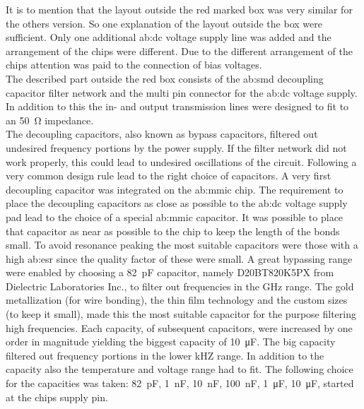 It is to mention that the layout outside the red marked box was very similar for the others version.
So one explanation of the layout outside the box were sufficient.
Only one additional \gls{ab:dc} voltage supply line was added and the arrangement of the chips were different.
Due to the different arrangement of the chips attention was paid to the connection of bias voltages.\\
The described part outside the red box consists of the \gls{ab:smd} decoupling capacitor filter network and the multi pin connector for the \gls{ab:dc} voltage supply.
In addition to this the in- and output transmission lines were designed to fit to an \SI{50}{\ohm} impedance. \\
The decoupling capacitors, also known as bypass capacitors, filtered out undesired frequency portions by the power supply.
If the filter network did not work properly, this could lead to undesired oscillations of the circuit.
Following a very common design rule lead to the right choice of capacitors.
A very first decoupling capacitor was integrated on the \gls{ab:mmic} chip.
The requirement to place the decoupling capacitors as close as possible to the \gls{ab:dc} voltage supply pad lead to the choice of a special \gls{ab:mmic} capacitor.
It was possible to place that capacitor as near as possible to the chip to keep the length of the bonds small.
To avoid resonance peaking the most suitable capacitors were those with a high \gls{ab:esr} since the quality factor of these were small.
A great bypassing range were enabled by choosing a \SI{82}{\pico \farad} capacitor, namely D20BT820K5PX from Dielectric Laboratories Inc., to filter out frequencies in the GHz range.
The gold metallization (for wire bonding), the thin film technology and the custom sizes (to keep it small), made this the most suitable capacitor for the purpose filtering high frequencies.
Each capacity, of subsequent capacitors, were increased by one order in magnitude yielding the biggest capacity of \SI{10}{\micro \farad}.
The big capacity filtered out frequency portions in the lower kHZ range.
In addition to the capacity also the temperature and voltage range had to fit.
The following choice for the capacities was taken: \SI{82}{\pico \farad}, \SI{1}{\nano \farad}, \SI{10}{\nano \farad}, \SI{100}{\nano \farad}, \SI{1}{\micro \farad}, \SI{10}{\micro \farad}, started at the chips supply pin. \\

